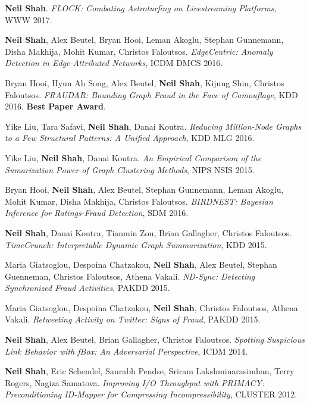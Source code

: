 \documentclass{article}
\begin{document}
\begin{etaremune}[itemsep=1pt,parsep=0pt]
\item {\bf Neil Shah}. \emph{FLOCK: Combating Astroturfing on Livestreaming Platforms}, WWW 2017.

\item {\bf Neil Shah}, Alex Beutel, Bryan Hooi, Leman Akoglu, Stephan Gunnemann, Disha Makhija, Mohit Kumar, Christos Faloutsos. \emph{EdgeCentric: Anomaly Detection in Edge-Attributed Networks}, ICDM DMCS 2016.

\item Bryan Hooi, Hyun Ah Song, Alex Beutel, {\bf Neil Shah}, Kijung Shin, Christos Faloutsos. \emph{FRAUDAR: Bounding Graph Fraud in the Face of Camouflage}, KDD 2016.  {\bf Best Paper Award}.

\item Yike Liu, Tara Safavi, {\bf Neil Shah}, Danai Koutra. \emph{Reducing Million-Node Graphs to a Few Structural Patterns: A Unified Approach}, KDD MLG 2016.

\item Yike Liu, {\bf Neil Shah}, Danai Koutra. \emph{An Empirical Comparison of the Sumarization Power of Graph Clustering Methods}, NIPS NSIS 2015.

\item Bryan Hooi, {\bf Neil Shah}, Alex Beutel, Stephan Gunnemann, Leman Akoglu, Mohit Kumar, Disha Makhija, Christos Faloutsos. \emph{BIRDNEST: Bayesian Inference for Ratings-Fraud Detection}, SDM 2016.

\item {\bf Neil Shah}, Danai Koutra, Tianmin Zou, Brian Gallagher, Christos Faloutsos. \emph{TimeCrunch: Interpretable Dynamic Graph Summarization}, KDD 2015.

\item Maria Giatsoglou, Despoina Chatzakou, {\bf Neil Shah}, Alex Beutel, Stephan Guenneman, Christos Faloutsos, Athena Vakali. \emph{ND-Sync: Detecting Synchronized Fraud Activities}, PAKDD 2015.

\item Maria Giatsoglou, Despoina Chatzakou, {\bf Neil Shah}, Christos Faloutsos, Athena Vakali. \emph{Retweeting Activity on Twitter: Signs of Fraud}, PAKDD 2015.

\item {\bf Neil Shah}, Alex Beutel, Brian Gallagher, Christos Faloutsos. \emph{Spotting Suspicious Link Behavior with fBox: An Adversarial Perspective}, ICDM 2014.

\item {\bf Neil Shah}, Eric Schendel, Saurabh Pendse, Sriram Lakshminarasimhan, Terry Rogers, Nagiza Samatova. \emph{Improving I/O Throughput with PRIMACY: Preconditioning ID-Mapper for Compressing Incompressibility}, CLUSTER 2012.


\end{etaremune}
\end{document}
